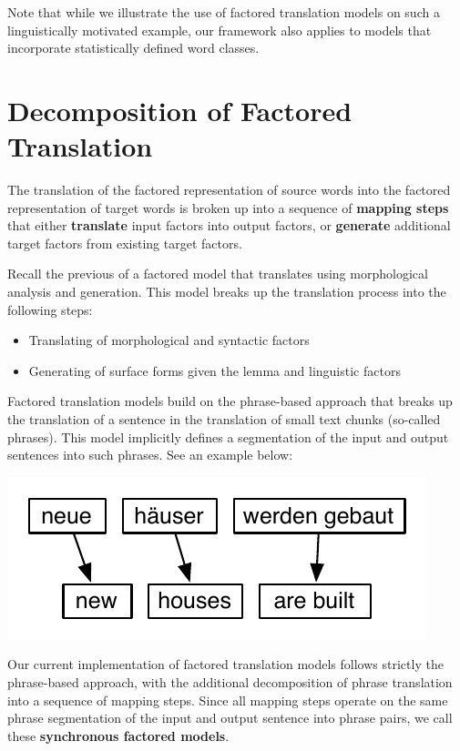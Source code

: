 \documentclass[11pt]{report}
\theoremstyle{plain}
\begin{document}
Note that while we illustrate the use of factored translation models on such a linguistically motivated example, our framework also applies to models that incorporate statistically defined word classes.

\section{Decomposition of Factored Translation}\label{sec:factored-decomposition}
The translation of the factored representation of source words into the factored representation of target words is broken up into a sequence of {\bf mapping steps} that either {\bf translate} input factors into output factors, or {\bf generate} additional target factors from existing target factors.

Recall the previous  of a factored model that translates using morphological analysis and generation. This model breaks up the translation process into the following steps: \vspace{-3pt}
{
\begin{itemize}\itemsep=-3pt
\item Translating of morphological and syntactic factors
\item Generating of surface forms given the lemma and linguistic factors
\end{itemize}
}

Factored translation models build on the phrase-based approach that breaks up the translation of a sentence in the translation of small text chunks (so-called phrases). This model implicitly defines a segmentation of the input and output sentences into such phrases. See an example below:

\begin{center}
\includegraphics[scale=0.75]{phrase-model-houses.pdf}
\end{center}

Our current implementation of factored translation models follows strictly the phrase-based approach, with the additional decomposition of phrase translation into a sequence of mapping steps. Since all mapping steps operate on the same phrase segmentation of the input and output sentence into phrase pairs, we call these {\bf synchronous factored models}. 
\end{document}
